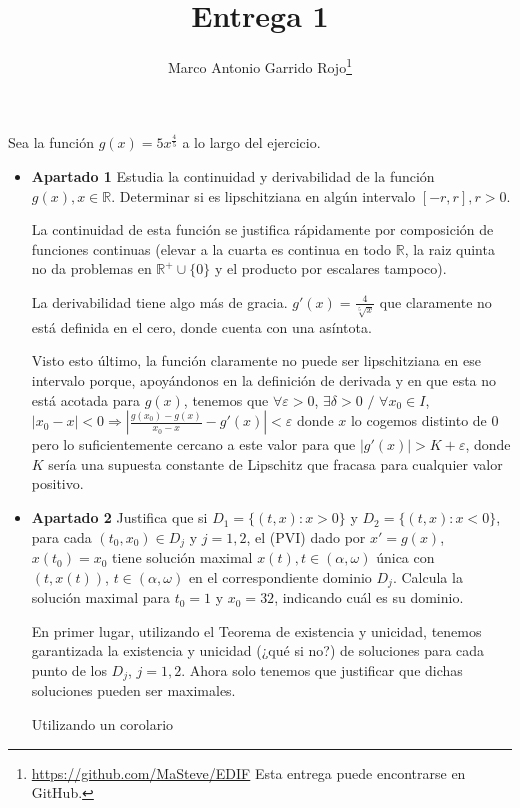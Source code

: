 \documentclass[spanish, a4paper, 12pt] {article}
\begin{document}
\title{Entrega 1}
\author{Marco Antonio Garrido Rojo\thanks{\url{https://github.com/MaSteve/EDIF} Esta entrega puede encontrarse en GitHub.}}
\date{}
\maketitle
Sea la función $g(x) = 5x^{\frac{4}{5}}$ a lo largo del ejercicio.
\begin{itemize}
\item{
\textbf{Apartado 1} Estudia la continuidad y derivabilidad de la función $g(x), x \in \mathbb{R}$. Determinar si es lipschitziana en algún intervalo $[-r, r], r > 0$.

La continuidad de esta función se justifica rápidamente por composición de funciones continuas (elevar a la cuarta es continua en todo $\mathbb{R}$, la raiz quinta no da problemas en $\mathbb{R}^{+} \cup \{0\}$ y el producto por escalares tampoco).

La derivabilidad tiene algo más de gracia. $g'(x) = \frac{4}{\sqrt[5]{x}}$ que claramente no está definida en el cero, donde cuenta con una asíntota.

Visto esto último, la función claramente no puede ser lipschitziana en ese intervalo porque, apoyándonos en la definición de derivada y en que esta no está acotada para $g(x)$, tenemos que $\forall \varepsilon > 0$, $\exists \delta > 0$ $/$ $\forall x_0 \in I$, $|x_0 - x| < 0 \Rightarrow |\frac{g(x_0)-g(x)}{x_0 - x} - g'(x)| < \varepsilon$ donde $x$ lo cogemos distinto de $0$ pero lo suficientemente cercano a este valor para que $|g'(x)| > K + \varepsilon$, donde $K$ sería una supuesta constante de Lipschitz que fracasa para cualquier valor positivo.
}
\item{
\textbf{Apartado 2} Justifica que si $D_1 = \{(t,x): x > 0\}$ y $D_2 = \{(t,x): x < 0\}$, para cada $(t_0, x_0) \in D_j$ y $j = 1, 2$, el (PVI) dado por $x' = g(x)$, $x(t_0) = x_0$ tiene solución maximal $x(t), t \in (\alpha, \omega)$ única con $(t, x(t))$, $t \in (\alpha, \omega)$ en el correspondiente dominio $D_j$. Calcula la solución maximal para $t_0 = 1$ y $x_0 = 32$, indicando cuál es su dominio.

En primer lugar, utilizando el Teorema de existencia y unicidad, tenemos garantizada la existencia y unicidad (¿qué si no?) de soluciones para cada punto de los $D_j$, $j = 1, 2$. Ahora solo tenemos que justificar que dichas soluciones pueden ser maximales.

Utilizando un corolario

}
\end{itemize}
\end{document}
